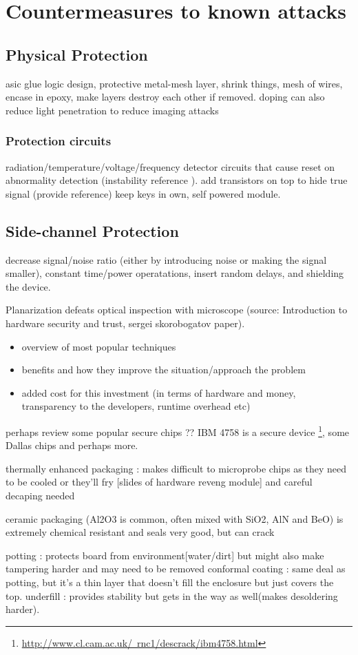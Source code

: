 \section{Countermeasures to known attacks}
\label{sec:defenses}
\subsection{Physical Protection}
asic glue logic design, protective metal-mesh layer, shrink things, mesh of wires, encase in epoxy, make layers destroy each other if removed. doping can also reduce light penetration to reduce imaging attacks 
\subsubsection{Protection circuits}
radiation/temperature/voltage/frequency detector circuits that cause reset on abnormality detection (instability reference \citep{anderson:cautionary_note}). add transistors on top to hide true signal (provide reference)
 keep keys in own, self powered module.
\subsection{Side-channel Protection}
decrease signal/noise ratio (either by introducing noise or making the signal smaller), constant time/power operatations, insert random delays\citep{sergei:thesis}, \citep{kocher:DPA} and shielding the device.

Planarization defeats optical inspection with microscope (source: Introduction to hardware security and trust, sergei skorobogatov paper).\\
	\begin{itemize}
	\item overview of most popular techniques \\
	\item benefits and how they improve the situation/approach the problem
	\item added cost for this investment (in terms of hardware and money, transparency to the developers, runtime overhead etc)\\
	\end{itemize}
	
	perhaps review some popular secure chips ?? IBM 4758 is a secure device \footnote{\href{http://www.cl.cam.ac.uk/~rnc1/descrack/ibm4758.html}{http://www.cl.cam.ac.uk/~rnc1/descrack/ibm4758.html}}, some Dallas chips and perhaps more.
	
	thermally enhanced packaging : makes difficult to microprobe chips as they need to be cooled or they'll fry [slides of hardware reveng module] and careful decaping needed
	
	ceramic packaging (Al2O3 is common, often mixed with SiO2, AlN and BeO) is extremely chemical resistant and seals very good, but can crack
	
	potting : protects board from environment[water/dirt] but might also make tampering harder and may need to be removed
	conformal coating : same deal as potting, but it's a thin layer that doesn't fill the enclosure but just covers the top.
	underfill : provides stability but gets in the way as well(makes desoldering harder).